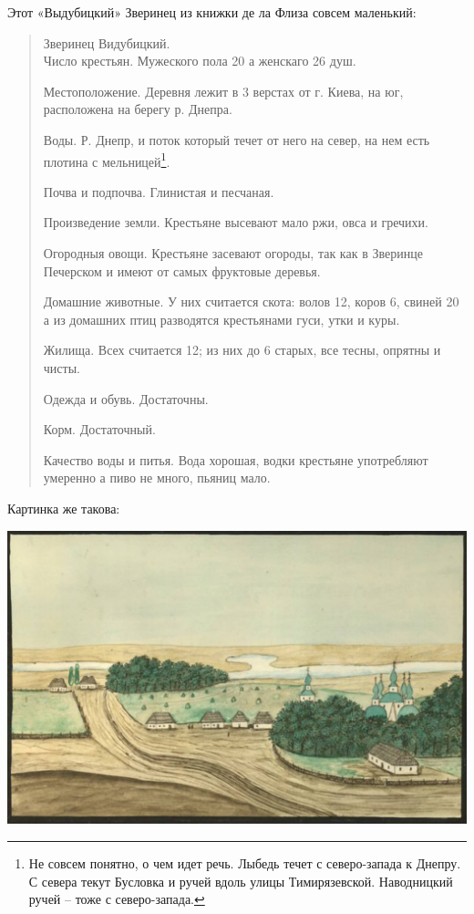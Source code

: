 
Этот «Выдубицкий» Зверинец из книжки де ла Флиза совсем маленький:

\begin{quotation}
Зверинец Видубицкий.\\

Число крестьян. Мужеского пола 20 а женскаго 26 душ.

Местоположение. Деревня лежит в 3 верстах от г. Киева, на юг, расположена на берегу р. Днепра.

Воды. Р. Днепр, и поток который течет от него на север, на нем есть плотина с мельницей\footnote{Не совсем понятно, о чем идет речь. Лыбедь течет с северо-запада к Днепру. С севера текут Бусловка и ручей вдоль улицы Тимирязевской. Наводницкий ручей – тоже с северо-запада.}.

Почва и подпочва. Глинистая и песчаная.

Произведение земли. Крестьяне высевают мало ржи, овса и гречихи.

Огородныя овощи. Крестьяне засевают огороды, так как в Зверинце Печерском и имеют от самых фруктовые деревья.

Домашние животные. У них считается скота: волов 12, коров 6, свиней 20 а из домашних птиц разводятся крестьянами гуси, утки и куры.

Жилища. Всех считается 12; из них до 6 старых, все тесны, опрятны и чисты.

Одежда и обувь. Достаточны.

Корм. Достаточный.

Качество воды и питья. Вода хорошая, водки крестьяне употребляют умеренно а пиво не много, пьяниц мало.
\end{quotation}

Картинка же такова:

\begin{center}
\includegraphics[width=\linewidth]{chast-vosp/zver/zver-vyd.jpg}
\end{center}


